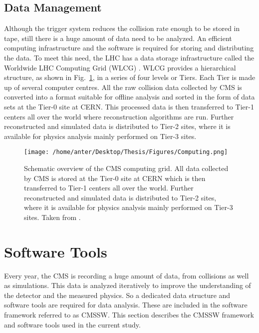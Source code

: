 \subsection{Data Management}
Although the trigger system reduces the collision rate enough to be stored in tape, still there is a huge amount of data need to be analyzed. An efficient computing infrastructure and the software is required for storing and distributing the data. To meet this need, the LHC has a data storage infrastructure called the Worldwide LHC Computing Grid (WLCG) \cite{Bird:2005js}. WLCG provides a hierarchical structure, as shown in Fig.~\ref{fig:Computing}, in a series of four levels or Tiers. Each Tier is made up of several computer centres. All the raw collision data collected by CMS is converted into a format suitable for offline analysis and sorted in the form of data sets at the Tier-0 site at CERN. This processed data is then transferred to Tier-1 centers all over the world where reconstruction algorithms are run. Further reconstructed and simulated data is distributed to Tier-2 sites, where it is available for physics analysis mainly performed on Tier-3 sites. %

\begin{figure}[!h]
\begin{center}
\vspace*{3mm} 
\hspace*{-5mm}
\texttt{[image: /home/anter/Desktop/Thesis/Figures/Computing.png]}\\
\vspace*{4mm}
\caption[Schematic overview of the CMS computing grid.]{Schematic overview of the CMS computing grid. All data collected by CMS is stored at the Tier-0 site at CERN which is then transferred to Tier-1 centers all over the world. Further reconstructed and simulated data is distributed to Tier-2 sites, where it is available for physics analysis mainly performed on Tier-3 sites. Taken from \cite{Bird:2005js}.}
\label{fig:Computing}
\end{center}
\end{figure}

\section{Software Tools}
Every year, the CMS is recording a huge amount of data, from collisions as well as simulations. This data is analyzed iteratively to improve the understanding of the detector and the measured physics. So a dedicated data structure and software tools are required for data analysis. These are included in the software framework referred to as CMSSW. This section describes the CMSSW framework and software tools used in the current study.

